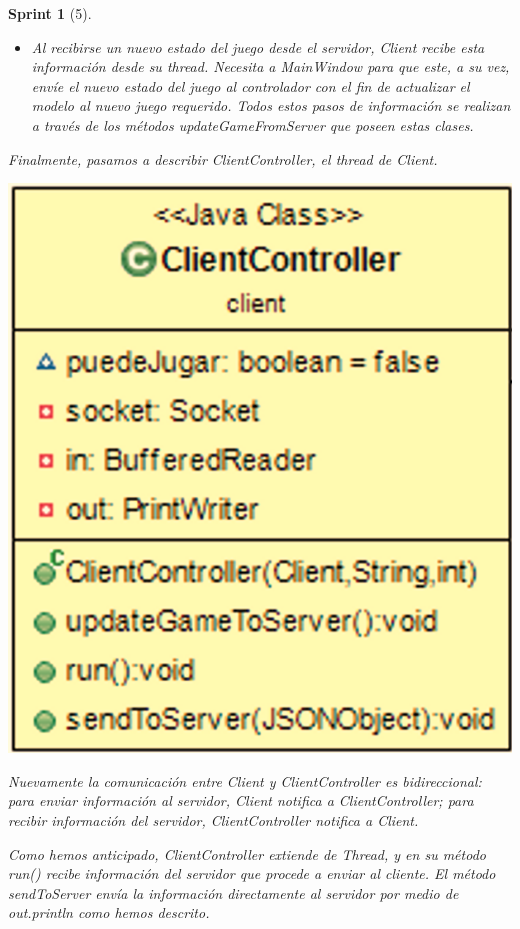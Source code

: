 \documentclass{article}
\theoremstyle{break}
\newtheorem*{sprint}{Sprint}
\begin{document}
\begin{sprint}[5]
\begin{itemize}
\item Al recibirse un nuevo estado del juego desde el servidor, Client recibe esta información desde su thread. Necesita a MainWindow para que este, a su vez, envíe el nuevo estado del juego al controlador con el fin de actualizar el modelo al nuevo juego requerido. Todos estos pasos de información se realizan a través de los métodos updateGameFromServer que poseen estas clases.
\end{itemize}

Finalmente, pasamos a describir ClientController, el thread de Client.

\begin{center}
\includegraphics[scale=0.3]{ClientController-sprint5.png} 
\end{center}

Nuevamente la comunicación entre Client y ClientController es bidireccional: para enviar información al servidor, Client notifica a ClientController; para recibir información del servidor, ClientController notifica a Client.

Como hemos anticipado, ClientController extiende de Thread, y en su método run() recibe información del servidor que procede a enviar al cliente. El método sendToServer envía la información directamente al servidor por medio de out.println como hemos descrito.


\end{sprint}
\end{document}
